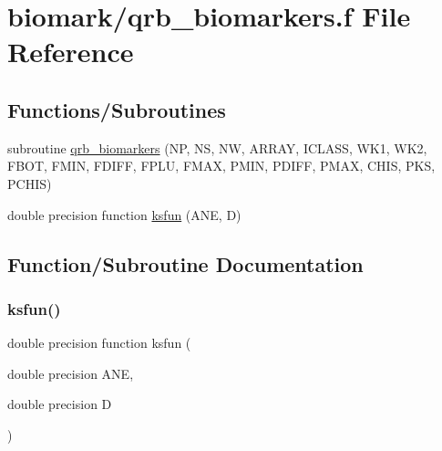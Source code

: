 \hypertarget{qrb__biomarkers_8f}{}\section{biomark/qrb\+\_\+biomarkers.f File Reference}
\label{qrb__biomarkers_8f}
\subsection*{Functions/\+Subroutines}
\begin{DoxyCompactItemize}
\item 
subroutine \hyperlink{qrb__biomarkers_8f_aa396e0143253e787bd36317aeb0c5d5e}{qrb\+\_\+biomarkers} (NP, NS, NW, A\+R\+R\+AY, I\+C\+L\+A\+SS, W\+K1, W\+K2, F\+B\+OT, F\+M\+IN, F\+D\+I\+FF, F\+P\+LU, F\+M\+AX, P\+M\+IN, P\+D\+I\+FF, P\+M\+AX, C\+H\+IS, P\+KS, P\+C\+H\+IS)
\item 
double precision function \hyperlink{qrb__biomarkers_8f_a8f785fa2e97a1b37e33ebcc7b35829f5}{ksfun} (A\+NE, D)
\end{DoxyCompactItemize}


\subsection{Function/\+Subroutine Documentation}
\mbox{\label{qrb__biomarkers_8f_a8f785fa2e97a1b37e33ebcc7b35829f5}} 
\subsubsection{\texorpdfstring{ksfun()}{ksfun()}}
{\footnotesize\ttfamily double precision function ksfun (\begin{DoxyParamCaption}\item[{double precision}]{A\+NE,  }\item[{double precision}]{D }\end{DoxyParamCaption})}

\mbox{\label{qrb__biomarkers_8f_aa396e0143253e787bd36317aeb0c5d5e}} 
